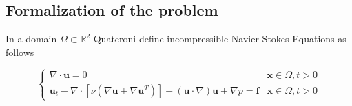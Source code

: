\documentclass[12pt,letterpaper]{article}
\begin{document}
\subsection{Formalization of the problem}

In a domain $\Omega\subset \mathbb{R}^2$  Quateroni\cite{quarteroni2009numerical} 
define incompressible Navier-Stokes Equations as follows 

\begin{equation}
  \begin{cases}
     \nabla \cdot \textbf{u} = 0 & \textbf{x} \in \Omega , t > 0\\
     
     \textbf{u}_t - \nabla \cdot[\nu (\nabla \textbf{u} + \nabla \textbf{u}^T)] + (\textbf{u}\cdot \nabla)
     \textbf{u}+ \nabla p = \textbf{f} & \textbf{x} \in \Omega , t > 0
  
  \end{cases}
  \label{1}
\end{equation}\\
\end{document}
